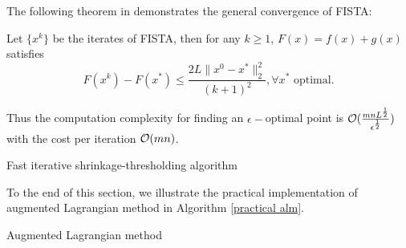 \documentclass{article}
\newcommand{\prox}{\mathrm{prox}}
\begin{document}
The following theorem in \cite{beck2009fast} demonstrates the general convergence of FISTA:
\begin{theorem}
Let $\{x^k\}$ be the iterates of FISTA, then for any $k\ge 1$, $F(x) =f(x)+g(x)$ satisfies
\begin{equation}
F(x^k)-F(x^*) \le \frac{2L\|x^0-x^*\|_2^2}{(k+1)^2},\forall x^*\text{ optimal}.
\end{equation}
\end{theorem}
Thus the computation complexity for finding an $\epsilon-$optimal point is $\mathcal O(\frac{mnL^\frac{1}{2}}{\epsilon^\frac{1}{2}})$ with the cost per iteration $\mathcal O(mn)$.
 \begin{algorithm}[H]
\caption{Fast iterative shrinkage-thresholding algorithm}
\begin{algorithmic}[1]\label{fista}
\STATE{Solve $x^k = \argmin_x \prox_{g(x)/L}(y^k-\frac{1}{L}\grad f(y^k))$}
\ENDWHILE
{}
\end{algorithmic}
 \end{algorithm}
To the end of this section, we illustrate the practical implementation of augmented Lagrangian method in Algorithm \ref{practical alm}.
\begin{algorithm}[H]
\caption{Augmented Lagrangian method}
\begin{algorithmic}[1]\label{practical alm}
\ENDWHILE 
{}
\end{algorithmic}
\end{algorithm}
\end{document}
